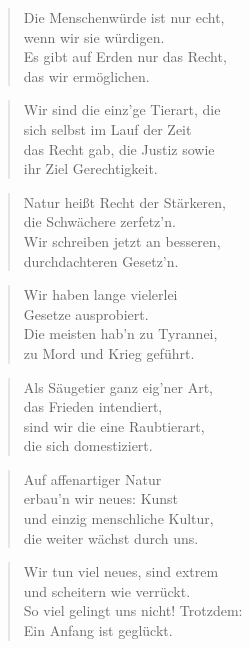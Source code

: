 \documentclass[10pt,a4paper]{article}
\begin{document}
\begin{paracol}{2}
\begin{verse}
Die Menschenwürde ist nur echt, \\
wenn wir sie würdigen. \\
Es gibt auf Erden nur das Recht, \\
das wir ermöglichen. \\
\end{verse}

\begin{verse}
Wir sind die einz’ge Tierart, die \\
sich selbst im Lauf der Zeit \\
das Recht gab, die Justiz sowie \\
ihr Ziel Gerechtigkeit. \\
\end{verse}

\begin{verse}
Natur heißt Recht der Stärkeren, \\
die Schwächere zerfetz’n. \\
Wir schreiben jetzt an besseren, \\
durchdachteren Gesetz’n. \\
\end{verse}

\begin{verse}
Wir haben lange vielerlei \\
Gesetze ausprobiert. \\
Die meisten hab’n zu Tyrannei, \\
zu Mord und Krieg geführt. \\
\end{verse}

\begin{verse}
Als Säugetier ganz eig’ner Art, \\
das Frieden intendiert, \\
sind wir die eine Raubtierart, \\
die sich domestiziert. \\
\end{verse}

\begin{verse}
Auf affenartiger Natur \\
erbau’n wir neues: Kunst \\
und einzig menschliche Kultur, \\
die weiter wächst durch uns. \\
\end{verse}

\begin{verse}
Wir tun viel neues, sind extrem \\
und scheitern wie verrückt. \\
So viel gelingt uns nicht! Trotzdem: \\
Ein Anfang ist geglückt. \\
\end{verse}


\end{paracol}
\end{document}
